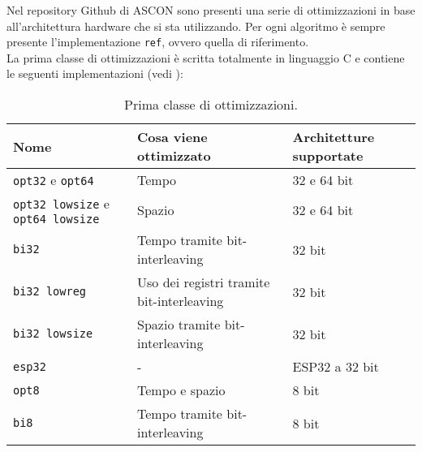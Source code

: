 Nel repository Github di ASCON sono presenti una serie di ottimizzazioni in base all'architettura hardware che si sta utilizzando. Per ogni algoritmo è sempre presente l'implementazione \texttt{ref}, ovvero quella di riferimento. \\

\noindent La prima classe di ottimizzazioni è scritta totalmente in linguaggio C e contiene le seguenti implementazioni\cite{github} (vedi ):
\begin{table}[H]
    \centering
	\begin{tabular}{|m{}<{\centering}||m{}<{\centering}|m{}<{\centering}|}
		\hline
        \textbf{Nome} & \textbf{Cosa viene ottimizzato} & \textbf{Architetture supportate} \\
		\hline \hline
        \texttt{opt32} e \texttt{opt64} & Tempo & 32 e 64 bit \\
        \hline
        \texttt{opt32 lowsize} e \texttt{opt64 lowsize} & Spazio & 32 e 64 bit \\
        \hline
        \texttt{bi32} & Tempo tramite bit-interleaving & 32 bit \\
        \hline
        \texttt{bi32 lowreg} & Uso dei registri tramite bit-interleaving & 32 bit \\
        \hline
        \texttt{bi32 lowsize} & Spazio tramite bit-interleaving & 32 bit \\
        \hline
        \texttt{esp32} & - & ESP32 a 32 bit \\
        \hline
        \texttt{opt8} & Tempo e spazio & 8 bit \\
        \hline
        \texttt{bi8} & Tempo tramite bit-interleaving & 8 bit \\
        \hline
    \end{tabular}
    \caption{Prima classe di ottimizzazioni.}
    \label{tab: prima_classe_ottimizzazioni}
\end{table}

